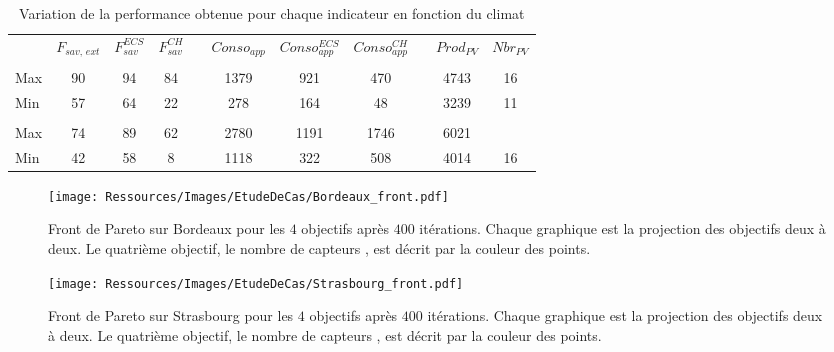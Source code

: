 \begin{table}
\centering
\caption[Performance maximale pouvant être obtenue pour différents indicateurs]
         {Variation de la performance obtenue pour chaque indicateur en fonction du climat}
\label{tab:bornes_front_pareto}
\begin{tabular}{L{2cm} c c c c c c c c c c}
    \toprule
                & $F_{sav,\,ext}$ & $F_{sav}^{ECS}$ & $F_{sav}^{CH}$ & & $Conso_{app}$ & $Conso_{app}^{ECS}$ & $Conso_{app}^{CH}$ & & $Prod_{PV}$ & $Nbr_{PV}$ \\
    \addlinespace
     \\
    \midrule
    Max & 90  & 94  & 84  &   & 1379  & 921 & 470 &   & 4743  & 16  \\
    Min & 57  & 64  & 22  &   & 278 & 164 & 48  &   & 3239  & 11  \\
    \addlinespace
     \\
    \midrule
    Max & 74  & 89  & 62  &   & 2780  & 1191  & 1746  &   & 6021  &   \\
    Min & 42  & 58  & 8 &   & 1118  & 322 & 508 &   & 4014  & 16  \\
    \bottomrule
\end{tabular}
\end{table}


\begin{figure}
    \centering
    \texttt{[image: Ressources/Images/EtudeDeCas/Bordeaux\_front.pdf]}
    \caption[Front de Pareto sur Bordeaux pour les $4$ objectifs après $400$ itérations]
             {Front de Pareto sur Bordeaux pour les $4$ objectifs après $400$ itérations.
              Chaque graphique est la projection des objectifs deux à deux.
              Le quatrième objectif, le nombre de capteurs , est décrit par la couleur des points.}
    \label{fig:front_pareto_bordeaux}
\end{figure}

\begin{figure}
    \centering
    \texttt{[image: Ressources/Images/EtudeDeCas/Strasbourg\_front.pdf]}
    \caption[Front de Pareto sur Strasbourg pour les $4$ objectifs après $400$ itérations]
             {Front de Pareto sur Strasbourg pour les $4$ objectifs après $400$ itérations.
              Chaque graphique est la projection des objectifs deux à deux.
              Le quatrième objectif, le nombre de capteurs , est décrit par la couleur des points.}
    \label{fig:front_pareto_strasbourg}
\end{figure}



